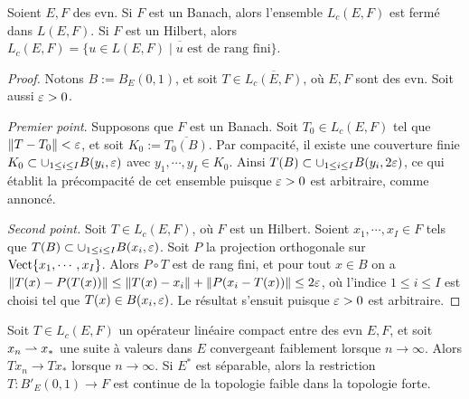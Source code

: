 \begin{proposition}
\label{prop:opCompactLimite}
%
	Soient $E,F$ des evn.
	Si $F$ est un Banach, alors l'ensemble $L_c(E,F)$ est fermé dans $L(E,F)$. 
	Si $F$ est un Hilbert, alors $L_c(E,F) = \overline{ \{u \in L(E,F)\mid u \text{ est de rang fini}\}}$.
\end{proposition}

\begin{proof}
Notons $B := B_E(0,1)$, et soit $T \in \overline {L_c(E,F)}$, où $E,F$ sont des evn. Soit aussi $\varepsilon>0$. 

\emph{Premier point}.
Supposons que  $F$ est un Banach. Soit $T_0 \in L_c(E,F)$ tel que $\|T-T_0\|<\varepsilon$, et soit $K_0 := \overline{T_0(B)}$. Par compacité, il existe une couverture finie $K_0 \subset \cup_{1 \leq i \leq I} B(y_i,\varepsilon)$ avec $y_1,\cdots,y_I \in K_0$. Ainsi $T(B) \subset \cup_{1 \leq i \leq I} B(y_i,2\varepsilon)$, ce qui établit la précompacité de cet ensemble puisque $\varepsilon>0$ est arbitraire, comme annoncé. 

\emph{Second point.}
Soit $T \in L_c(E,F)$, où $F$ est un Hilbert. Soient $x_1,\cdots,x_I \in F$ tels que $T(B) \subset \cup_{1 \leq i \leq I} B(x_i,\varepsilon)$. Soit $P$ la projection orthogonale sur $\operatorname{Vect}\{x_1,\cdots,x_I\}$. Alors $P \circ T$ est de rang fini, et pour tout $x \in B$ on a $\|T(x)-P(T(x))\| \leq \|T(x)-x_i\| + \|P(x_i - T(x))\| \leq 2 \varepsilon$, où l'indice $1 \leq i \leq I$ est choisi tel que $T(x) \in B(x_i,\varepsilon)$. Le résultat s'ensuit puisque $\varepsilon>0$ est arbitraire.
\end{proof}	

\begin{proposition}
\label{prop:opCompactComplCont}
%
	Soit $T \in L_c(E,F)$ un opé\-rateur linéaire compact entre des evn $E,F$, et soit $x_n \rightharpoonup x_*$ une suite à valeurs dans $E$ convergeant faiblement lorsque $n \to \infty$. 
	Alors $T x_n \to T x_*$ lorsque $n \to \infty$. 
	Si $E^*$ est séparable, alors la restriction $T : B'_E(0,1) \to F$ est continue de la topologie faible dans la topologie forte. 
\end{proposition}

